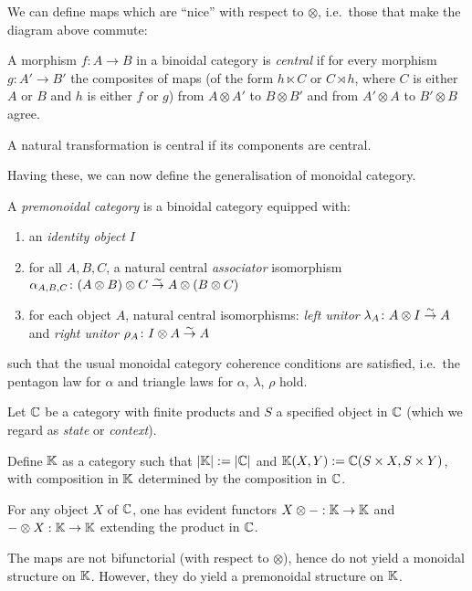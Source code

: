 We can define maps which are ``nice'' with respect to $\otimes$, i.e.~those
that make the diagram above commute:

\begin{definition}
    A morphism $f: A \to B$ in a binoidal category is \emph{central} if for
    every morphism $g: A' \to B'$ the composites of maps (of the form $h
    \ltimes C$ or $C \rtimes h$, where $C$ is either $A$ or $B$ and $h$ is
    either $f$ or $g$) from $A \otimes A'$ to $B \otimes B'$ and from $A'
    \otimes A$ to $B' \otimes B$ agree.
\end{definition}

A natural transformation is central if its components are central.

Having these, we can now define the generalisation of monoidal category.

\begin{definition}
    A \emph{premonoidal category} is a binoidal category equipped with:
    \begin{enumerate}
        \item an \emph{identity object} $I$
        \item for all $A, B, C$, a natural central \emph{associator}
            isomorphism $\alpha_{A,B,C}\colon (A \otimes B) \otimes C \overset{\sim}{\to} A
            \otimes (B \otimes C)$
        \item for each object $A$, natural central isomorphisms: \emph{left
            unitor} $\lambda_A\colon A \otimes I \overset{\sim}{\to} A$ and \emph{right unitor}
            $\rho_A\colon I \otimes A \overset{\sim}{\to} A$
    \end{enumerate}

    such that the usual monoidal category coherence conditions are satisfied,
    i.e.~the pentagon law for $\alpha$ and triangle laws for $\alpha$,
    $\lambda$, $\rho$ hold.

\end{definition}

\begin{example}
    Let $\mathbb{C}$ be a category with finite products and $S$ a specified object
    in $\mathbb{C}$ (which we regard as \emph{state} or \emph{context}).

    Define $\mathbb{K}$ as a category such that $|\mathbb{K}| := |\mathbb{C}|$ and
    $\mathbb{K}(X, Y) := \mathbb{C}(S \times X, S \times Y)$, with composition in
    $\mathbb{K}$ determined by the composition in $\mathbb{C}$.

    For any object $X$ of $\mathbb{C}$, one has evident functors
    $X \otimes -: \mathbb{K} \to \mathbb{K}$ and
    $- \otimes X: \mathbb{K} \to \mathbb{K}$ extending the product in $\mathbb{C}$.

    The maps are not bifunctorial (with respect to $\otimes$), hence do not
    yield a monoidal structure on $\mathbb{K}$. However, they do  yield a
    premonoidal structure on $\mathbb{K}$.
\end{example}

